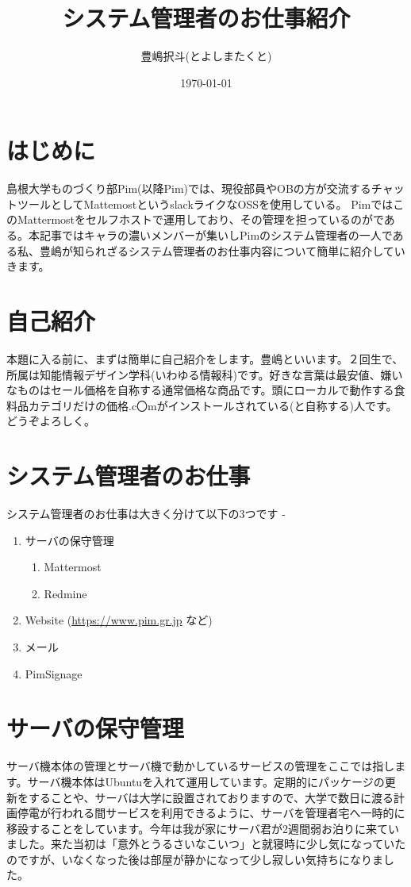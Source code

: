 \documentclass[a4paper,11pt]{jsarticle}
\begin{document}
\title{システム管理者のお仕事紹介}
\author{豊嶋択斗(とよしまたくと)}
\date{\today}
\maketitle

\section{はじめに}
島根大学ものづくり部Pim(以降Pim)では、現役部員やOBの方が交流するチャットツールとしてMattemostというslackライクなOSSを使用している。 PimではこのMattermostをセルフホストで運用しており、その管理を担っているのがである。本記事ではキャラの濃いメンバーが集いしPimのシステム管理者の一人である私、豊嶋が知られざるシステム管理者のお仕事内容について簡単に紹介していきます。

\section{自己紹介}
本題に入る前に、まずは簡単に自己紹介をします。豊嶋といいます。２回生で、所属は知能情報デザイン学科(いわゆる情報科)です。好きな言葉は最安値、嫌いなものはセール価格を自称する通常価格な商品です。頭にローカルで動作する食料品カテゴリだけの価格.c〇mがインストールされている(と自称する)人です。どうぞよろしく。

\section{システム管理者のお仕事}
システム管理者のお仕事は大きく分けて以下の3つです
-\begin{enumerate}
  \item サーバの保守管理
  \begin{enumerate}
    \item Mattermost
    \item Redmine
  \end{enumerate}
  \item Website (\url{https://www.pim.gr.jp} など)
  \item メール
  \item PimSignage
\end{enumerate}

\section{サーバの保守管理}
サーバ機本体の管理とサーバ機で動かしているサービスの管理をここでは指します。サーバ機本体はUbuntuを入れて運用しています。定期的にパッケージの更新をすることや、サーバは大学に設置されておりますので、大学で数日に渡る計画停電が行われる間サービスを利用できるように、サーバを管理者宅へ一時的に移設することをしています。今年は我が家にサーバ君が2週間弱お泊りに来ていました。来た当初は「意外とうるさいなこいつ」と就寝時に少し気になっていたのですが、いなくなった後は部屋が静かになって少し寂しい気持ちになりました。
\end{document}
